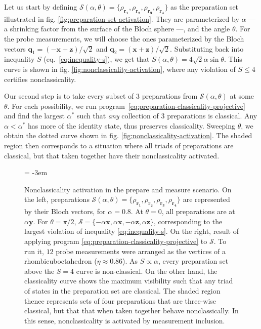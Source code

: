            Let us start by defining $\mathcal{S}(\alpha, \theta) = \{ \rho_{\mathbf{r_1}}, \rho_{\mathbf{r_2}}, \rho_{\mathbf{r_3}}, \rho_{\mathbf{r_4}} \}$ as the preparation set illustrated in fig. \ref{fig:preparation-set-activation}. They are parameterized by $\alpha$ --- a shrinking factor from the surface of the Bloch sphere ---, and the angle $\theta$. For the probe measurements, we will choose the ones parameterized by the Bloch vectors $\mathbf{q}_1 = (- \mathbf{x} + \mathbf{z}) / \sqrt{2}$ and  $\mathbf{q}_2 = (\mathbf{x} + \mathbf{z}) / \sqrt{2}$. Substituting back into inequality $S$ (eq.~\eqref{eq:inequality-s}), we get that $S(\alpha, \theta) = 4\sqrt{2} \alpha \sin \theta$. This curve is shown in fig. \ref{fig:nonclassicality-activation}, where any violation of $S \leq 4$ certifies nonclassicality.

            Our second step is to take every subset of $3$ preparations from $\mathcal{S}(\alpha, \theta)$ at some $\theta$. For each possibility, we run program~\eqref{eq:preparation-classicality-projective} and find the largest $\alpha^*$ such that \emph{any} collection of $3$ preparations is classical. Any $\alpha < \alpha^*$ has more of the identity state, thus preserves classicality. Sweeping $\theta$, we obtain the dotted curve shown in fig. \ref{fig:nonclassicality-activation}. The shaded region then corresponds to a situation where all triads of preparations are classical, but that taken together have their nonclassicality activated.

			\begin{figure*}[t!]
				\newdimen\subfigcapmargin  \subfigcapmargin  =  -3em
				\centering
				\hfill
				\hfill
				\caption{Nonclassicality activation in the prepare and measure scenario. On the left, preparations $\mathcal{S}(\alpha, \theta) = \{ \rho_{\mathbf{r_1}}, \rho_{\mathbf{r_2}}, \rho_{\mathbf{r_3}}, \rho_{\mathbf{r_4}} \}$ are represented by their Bloch vectors, for $\alpha=0.8$. At $\theta=0$, all preparations are at $\alpha \mathbf{y}$. For $\theta = \pi/2$, $\mathcal{S} =  \{ -\alpha\mathbf{x}, \alpha\mathbf{x}, -\alpha\mathbf{z}, \alpha\mathbf{z} \}$, corresponding to the largest violation of inequality \eqref{eq:inequality-s}. On the right, result of applying program \ref{eq:preparation-classicality-projective} to $\mathcal{S}$. To run it, $12$ probe measurements were arranged as the vertices of a rhombicuboctahedron ($\eta \approx 0.86$). As $S \propto \alpha$, every preparation set above the $S=4$ curve is non-classical. On the other hand, the classicality curve shows the maximum visibility such that any triad of states in the preparation set are classical. The shaded region thence represents sets of four preparations that are three-wise classical, but that that when taken together behave nonclassically. In this sense, nonclassicality is activated by measurement inclusion.}
			\end{figure*}
            
